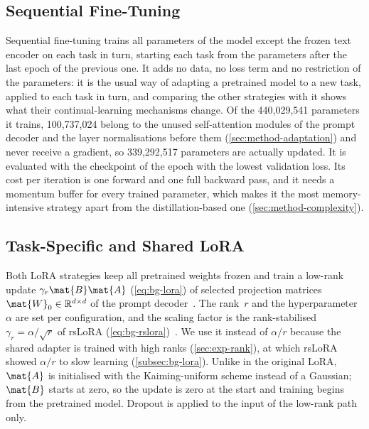 \subsection{Sequential Fine-Tuning}
\label{subsec:method-seqft}

Sequential fine-tuning trains all parameters of the model except the frozen text encoder on each task in turn, starting each task from the parameters after the last epoch of the previous one.
It adds no data, no loss term and no restriction of the parameters: it is the usual way of adapting a pretrained model to a new task, applied to each task in turn, and comparing the other strategies with it shows what their continual-learning mechanisms change.
Of the 440{,}029{,}541 parameters it trains, 100{,}737{,}024 belong to the unused self-attention modules of the prompt decoder and the layer normalisations before them (\cref{sec:method-adaptation}) and never receive a gradient, so 339{,}292{,}517 parameters are actually updated.
It is evaluated with the checkpoint of the epoch with the lowest validation loss.
Its cost per iteration is one forward and one full backward pass, and it needs a momentum buffer for every trained parameter, which makes it the most memory-intensive strategy apart from the distillation-based one (\cref{sec:method-complexity}).

\subsection{Task-Specific and Shared LoRA}
\label{subsec:method-lora}

Both LoRA strategies keep all pretrained weights frozen and train a low-rank update $\gamma_r\mat{B}\mat{A}$ (\cref{eq:bg-lora}) of selected projection matrices $\mat{W}_0 \in \mathbb{R}^{d \times d}$ of the prompt decoder~\cite{hu2022lora}.
The rank~$r$ and the hyperparameter~$\alpha$ are set per configuration, and the scaling factor is the rank-stabilised $\gamma_r = \alpha / \sqrt{r}$ of rsLoRA (\cref{eq:bg-rslora})~\cite{kalajdzievski2023rankstabilizationscalingfactor}.
We use it instead of $\alpha / r$ because the shared adapter is trained with high ranks (\cref{sec:exp-rank}), at which rsLoRA showed $\alpha / r$ to slow learning (\cref{subsec:bg-lora}).
Unlike in the original LoRA, $\mat{A}$ is initialised with the Kaiming-uniform scheme instead of a Gaussian; $\mat{B}$ starts at zero, so the update is zero at the start and training begins from the pretrained model.
Dropout is applied to the input of the low-rank path only.

